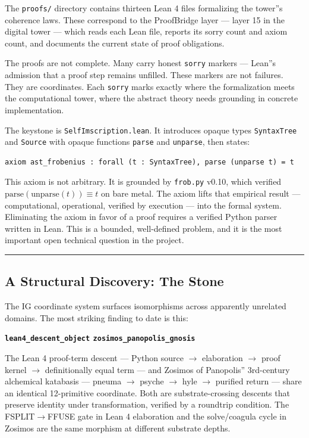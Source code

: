 \documentclass[12pt,a4paper]{article}
\begin{document}
The \texttt{proofs/} directory contains thirteen Lean 4 files formalizing the tower''s coherence laws. These correspond to the ProofBridge layer --- layer 15 in the digital tower --- which reads each Lean file, reports its sorry count and axiom count, and documents the current state of proof obligations.

The proofs are not complete. Many carry honest \texttt{sorry} markers --- Lean''s admission that a proof step remains unfilled. These markers are not failures. They are coordinates. Each \texttt{sorry} marks exactly where the formalization meets the computational tower, where the abstract theory needs grounding in concrete implementation.

The keystone is \texttt{SelfImscription.lean}. It introduces opaque types \texttt{SyntaxTree} and \texttt{Source} with opaque functions \texttt{parse} and \texttt{unparse}, then states:

\begin{lstlisting}[language=lean]
axiom ast_frobenius : forall (t : SyntaxTree), parse (unparse t) = t
\end{lstlisting}

This axiom is not arbitrary. It is grounded by \texttt{frob.py} v0.10, which verified $\text{parse}(\text{unparse}(t)) \equiv t$ on bare metal. The axiom lifts that empirical result --- computational, operational, verified by execution --- into the formal system. Eliminating the axiom in favor of a proof requires a verified Python parser written in Lean. This is a bounded, well-defined problem, and it is the most important open technical question in the project.

\begin{center}
\rule{0.5\textwidth}{0.4pt}
\end{center}

\subsection{A Structural Discovery: The Stone}

The IG coordinate system surfaces isomorphisms across apparently unrelated domains. The most striking finding to date is this:

\textbf{\texttt{lean4\_descent\_object} \equiv \texttt{zosimos\_panopolis\_gnosis}}

The Lean 4 proof-term descent --- Python source $\rightarrow$ elaboration $\rightarrow$ proof kernel $\rightarrow$ definitionally equal term --- and Zosimos of Panopolis'' 3rd-century alchemical katabasis --- pneuma $\rightarrow$ psyche $\rightarrow$ hyle $\rightarrow$ purified return --- share an identical 12-primitive coordinate. Both are substrate-crossing descents that preserve identity under transformation, verified by a roundtrip condition. The FSPLIT$\rightarrow$FFUSE gate in Lean 4 elaboration and the solve/coagula cycle in Zosimos are the same morphism at different substrate depths.
\end{document}
